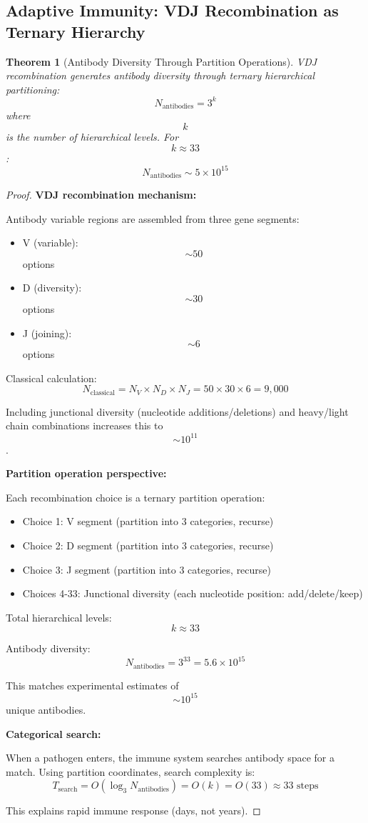 \documentclass[12pt,a4paper]{article}
\newtheorem{theorem}{Theorem}
\begin{document}
\subsection{Adaptive Immunity: VDJ Recombination as Ternary Hierarchy}

\begin{theorem}[Antibody Diversity Through Partition Operations]
VDJ recombination generates antibody diversity through ternary hierarchical partitioning:
$$
N_{\text{antibodies}} = 3^k
$$
where $$k$$ is the number of hierarchical levels. For $$k \approx 33$$:
$$
N_{\text{antibodies}} \sim 5 \times 10^{15}
$$
\end{theorem}

\begin{proof}
\textbf{VDJ recombination mechanism:}

Antibody variable regions are assembled from three gene segments:
\begin{itemize}
\item V (variable): $$\sim 50$$ options
\item D (diversity): $$\sim 30$$ options  
\item J (joining): $$\sim 6$$ options
\end{itemize}

Classical calculation:
$$
N_{\text{classical}} = N_V \times N_D \times N_J = 50 \times 30 \times 6 = 9,000
$$

Including junctional diversity (nucleotide additions/deletions) and heavy/light chain combinations increases this to $$\sim 10^{11}$$.

\textbf{Partition operation perspective:}

Each recombination choice is a ternary partition operation:
\begin{itemize}
\item Choice 1: V segment (partition into 3 categories, recurse)
\item Choice 2: D segment (partition into 3 categories, recurse)
\item Choice 3: J segment (partition into 3 categories, recurse)
\item Choices 4-33: Junctional diversity (each nucleotide position: add/delete/keep)
\end{itemize}

Total hierarchical levels: $$k \approx 33$$

Antibody diversity:
$$
N_{\text{antibodies}} = 3^{33} = 5.6 \times 10^{15}
$$

This matches experimental estimates of $$\sim 10^{15}$$ unique antibodies.

\textbf{Categorical search:}

When a pathogen enters, the immune system searches antibody space for a match. Using partition coordinates, search complexity is:
$$
T_{\text{search}} = O(\log_3 N_{\text{antibodies}}) = O(k) = O(33) \approx 33 \text{ steps}
$$

This explains rapid immune response (days, not years).
\end{proof}
\end{document}

